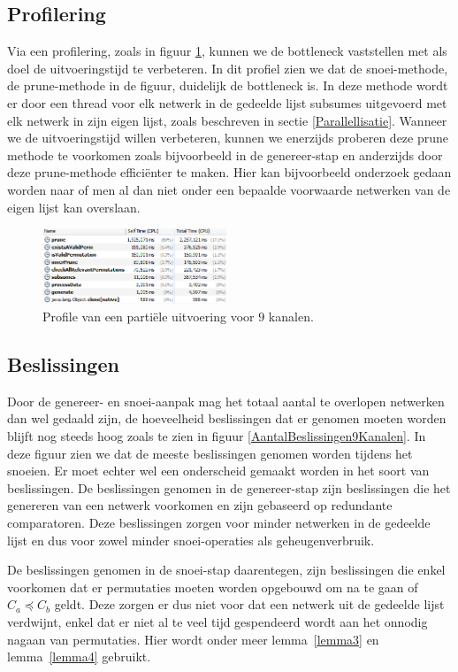 \documentclass{article}
\begin{document}
\subsection{Profilering}
Via een profilering, zoals in figuur \ref{ProfileTime9}, kunnen we de bottleneck vaststellen met als doel de uitvoeringstijd te verbeteren.
In dit profiel zien we dat de snoei-methode, de prune-methode in de figuur, duidelijk de bottleneck is.
In deze methode wordt er door een thread voor elk netwerk in de gedeelde lijst subsumes uitgevoerd met elk netwerk in zijn eigen lijst, zoals beschreven in sectie \ref{Parallellisatie}.
Wanneer we de uitvoeringstijd willen verbeteren, kunnen we enerzijds proberen deze prune methode te voorkomen zoals bijvoorbeeld in de genereer-stap en anderzijds door deze prune-methode effici\"enter te maken.
Hier kan bijvoorbeeld onderzoek gedaan worden naar of men al dan niet onder een bepaalde voorwaarde netwerken van de eigen lijst kan overslaan.
\begin{figure}[!h]
\centering
\vspace{10pt}
\includegraphics[width=0.49\textwidth]{Profile_Time_9.png}
\caption{Profile van een parti\"ele uitvoering voor $9$ kanalen.} %
\label{ProfileTime9}
\end{figure}

\subsection{Beslissingen}
Door de genereer- en snoei-aanpak mag het totaal aantal te overlopen netwerken dan wel gedaald zijn, de hoeveelheid beslissingen dat er genomen moeten worden blijft nog steeds hoog zoals te zien in figuur \ref{AantalBeslissingen9Kanalen}.
In deze figuur zien we dat de meeste beslissingen genomen worden tijdens het snoeien.
Er moet echter wel een onderscheid gemaakt worden in het soort van beslissingen.
De beslissingen genomen in de genereer-stap zijn beslissingen die het genereren van een netwerk voorkomen en zijn gebaseerd op redundante comparatoren.
Deze beslissingen zorgen voor minder netwerken in de gedeelde lijst en dus voor zowel minder snoei-operaties als geheugenverbruik.

De beslissingen genomen in de snoei-stap daarentegen, zijn beslissingen die enkel voorkomen dat er permutaties moeten worden opgebouwd om na te gaan of $C_a \preceq C_b$ geldt.
Deze zorgen er dus niet voor dat een netwerk uit de gedeelde lijst verdwijnt, enkel dat er niet al te veel tijd gespendeerd wordt aan het onnodig nagaan van permutaties.
Hier wordt onder meer lemma~\ref{lemma3} en lemma~\ref{lemma4} gebruikt.
\end{document}
